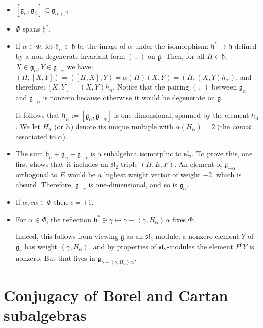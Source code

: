 \begin{itemize}
 \item $[\mathfrak g_\alpha,\mathfrak g_\beta]\subset\mathfrak g_{\alpha+\beta}$.
 \item $\Phi$ spans $\mathfrak h^*$.
 \item If $\alpha\in\Phi$, let $\mathfrak h_\alpha \in \mathfrak h$ be the image of $\alpha$ under the isomorphism: $\mathfrak h^*\to\mathfrak h$ defined by a non-degenerate invariant form $(\,,\,)$ on $\mathfrak g$. Then, for all $H\in \mathfrak h$, $X\in \mathfrak g_\alpha, Y\in\mathfrak g_{-\alpha}$ we have: $(H,[X,Y]) = ([H,X],Y) = \alpha(H) (X,Y) = (H, (X,Y) h_\alpha)$, and therefore: $[X,Y] = (X,Y) h_\alpha$. Notice that the pairing $(\,,\,)$ between $\mathfrak g_\alpha$ and $\mathfrak g_{-\alpha}$ is nonzero because otherwise it would be degenerate on $\mathfrak g$. 

It follows that $\mathfrak h_\alpha:= [\mathfrak g_\alpha,\mathfrak g_{-\alpha}]$ is one-dimensional, spanned by the element $h_\alpha$. We let $H_\alpha$ (or $\check\alpha$) denote its unique multiple with $\alpha(H_\alpha)=2$ (the \emph{coroot} associated to $\alpha$).

 \item The sum $\mathfrak h_\alpha+ \mathfrak g_\alpha + \mathfrak g_{-\alpha}$ is a subalgebra isomorphic to $\mathfrak{sl}_2$. To prove this, one first shows that it includes an $\mathfrak{sl}_2$-triple $(H,E,F)$. An element of $\mathfrak g_{-\alpha}$ orthogonal to $E$ would be a highest weight vector of weight $-2$, which is absurd. Therefore, $\mathfrak g_{-\alpha}$ is one-dimensional, and so is $\mathfrak g_\alpha$.

 \item If $\alpha, c\alpha\in \Phi$ then $c = \pm 1$.

 \item For $\alpha\in \Phi$, the reflection $\mathfrak h^*\ni \gamma \mapsto \gamma - \left<\gamma,H_\alpha\right> \alpha$ fixes $\Phi$.

Indeed, this follows from viewing $\mathfrak g$ as an $\mathfrak{sl}_2$-module: a nonzero element $Y$ of $\mathfrak g_\gamma$ has weight $\left<\gamma,H_\alpha\right>$, and by properties of $\mathfrak{sl}_2$-modules the element $F^pY$ is nonzero. But that lives in $\mathfrak g_{\gamma - \left<\gamma,H_\alpha\right> \alpha}$.
\end{itemize}




\section{Conjugacy of Borel and Cartan subalgebras}
\label{section-Borel-Cartan}


